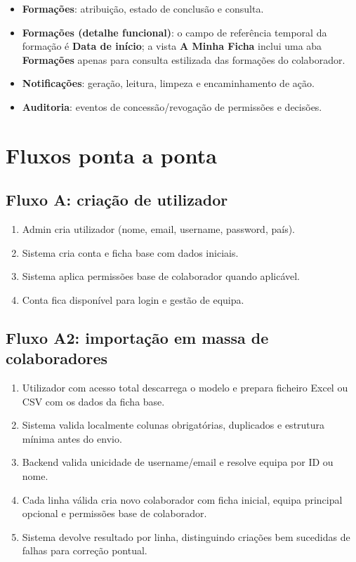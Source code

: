 \documentclass[11pt,a4paper]{article}
\begin{document}
\begin{itemize}
  \item \textbf{Formações}: atribuição, estado de conclusão e consulta.
  \item \textbf{Formações (detalhe funcional)}: o campo de referência temporal da formação é \textbf{Data de início}; a vista \textbf{A Minha Ficha} inclui uma aba \textbf{Formações} apenas para consulta estilizada das formações do colaborador.
  \item \textbf{Notificações}: geração, leitura, limpeza e encaminhamento de ação.
  \item \textbf{Auditoria}: eventos de concessão/revogação de permissões e decisões.
\end{itemize}

\section{Fluxos ponta a ponta}
\subsection{Fluxo A: criação de utilizador}
\begin{enumerate}
  \item Admin cria utilizador (nome, email, username, password, país).
  \item Sistema cria conta e ficha base com dados iniciais.
  \item Sistema aplica permissões base de colaborador quando aplicável.
  \item Conta fica disponível para login e gestão de equipa.
\end{enumerate}

\subsection{Fluxo A2: importação em massa de colaboradores}
\begin{enumerate}
  \item Utilizador com acesso total descarrega o modelo e prepara ficheiro Excel ou CSV com os dados da ficha base.
  \item Sistema valida localmente colunas obrigatórias, duplicados e estrutura mínima antes do envio.
  \item Backend valida unicidade de username/email e resolve equipa por ID ou nome.
  \item Cada linha válida cria novo colaborador com ficha inicial, equipa principal opcional e permissões base de colaborador.
  \item Sistema devolve resultado por linha, distinguindo criações bem sucedidas de falhas para correção pontual.
\end{enumerate}
\end{document}
